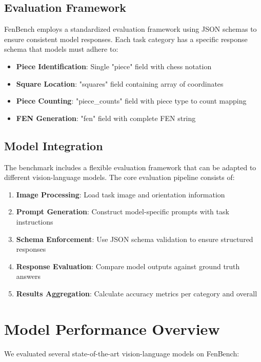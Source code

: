 \documentclass{article}
\begin{document}
\subsection{Evaluation Framework}

FenBench employs a standardized evaluation framework using JSON schemas to ensure consistent model responses. Each task category has a specific response schema that models must adhere to:

\begin{itemize}
    \item \textbf{Piece Identification}: Single "piece" field with chess notation
    \item \textbf{Square Location}: "squares" field containing array of coordinates
    \item \textbf{Piece Counting}: "piece\_counts" field with piece type to count mapping
    \item \textbf{FEN Generation}: "fen" field with complete FEN string
\end{itemize}

\subsection{Model Integration}

The benchmark includes a flexible evaluation framework that can be adapted to different vision-language models. The core evaluation pipeline consists of:

\begin{enumerate}
    \item \textbf{Image Processing}: Load task image and orientation information
    \item \textbf{Prompt Generation}: Construct model-specific prompts with task instructions
    \item \textbf{Schema Enforcement}: Use JSON schema validation to ensure structured responses  
    \item \textbf{Response Evaluation}: Compare model outputs against ground truth answers
    \item \textbf{Results Aggregation}: Calculate accuracy metrics per category and overall
\end{enumerate}

\section{Model Performance Overview}

We evaluated several state-of-the-art vision-language models on FenBench:
\end{document}
